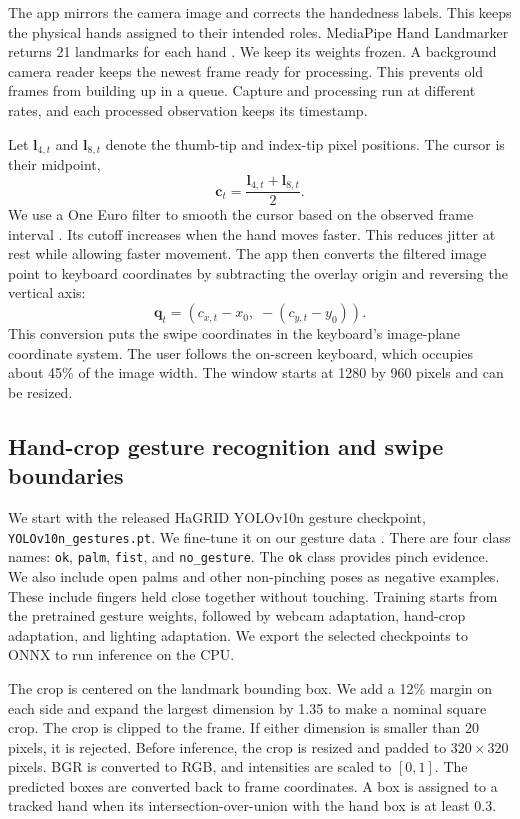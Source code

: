 \documentclass[preprint,12pt]{elsarticle}
\begin{document}
The app mirrors the camera image and corrects the handedness labels. This keeps the physical hands assigned to their intended roles. MediaPipe Hand Landmarker returns 21 landmarks for each hand \cite{mediapipe,mediapipehands}. We keep its weights frozen. A background camera reader keeps the newest frame ready for processing. This prevents old frames from building up in a queue. Capture and processing run at different rates, and each processed observation keeps its timestamp.

Let $\mathbf{l}_{4,t}$ and $\mathbf{l}_{8,t}$ denote the thumb-tip and index-tip pixel positions. The cursor is their midpoint,
\begin{equation}
\mathbf{c}_t=\frac{\mathbf{l}_{4,t}+\mathbf{l}_{8,t}}{2}.
\end{equation}
We use a One Euro filter to smooth the cursor based on the observed frame interval \cite{oneeuro}. Its cutoff increases when the hand moves faster. This reduces jitter at rest while allowing faster movement. The app then converts the filtered image point to keyboard coordinates by subtracting the overlay origin and reversing the vertical axis:
\begin{equation}
\mathbf{q}_t=(c_{x,t}-x_0,\;-(c_{y,t}-y_0)).
\end{equation}
This conversion puts the swipe coordinates in the keyboard's image-plane coordinate system. The user follows the on-screen keyboard, which occupies about 45\% of the image width. The window starts at 1280 by 960 pixels and can be resized.

\subsection{Hand-crop gesture recognition and swipe boundaries}\label{sec:pinch}
We start with the released HaGRID YOLOv10n gesture checkpoint, \nolinkurl{YOLOv10n_gestures.pt}. We fine-tune it on our gesture data \cite{yolov10,hagridv2}. There are four class names: \texttt{ok}, \texttt{palm}, \texttt{fist}, and \texttt{no\_gesture}. The \texttt{ok} class provides pinch evidence. We also include open palms and other non-pinching poses as negative examples. These include fingers held close together without touching. Training starts from the pretrained gesture weights, followed by webcam adaptation, hand-crop adaptation, and lighting adaptation. We export the selected checkpoints to ONNX to run inference on the CPU.

The crop is centered on the landmark bounding box. We add a 12\% margin on each side and expand the largest dimension by 1.35 to make a nominal square crop. The crop is clipped to the frame. If either dimension is smaller than 20 pixels, it is rejected. Before inference, the crop is resized and padded to $320\times320$ pixels. BGR is converted to RGB, and intensities are scaled to $[0,1]$. The predicted boxes are converted back to frame coordinates. A box is assigned to a tracked hand when its intersection-over-union with the hand box is at least 0.3.
\end{document}
